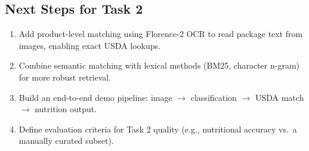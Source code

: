 \subsection{Next Steps for Task 2}

\begin{enumerate}[nosep,leftmargin=1.5em]
 \item Add product-level matching using Florence-2 OCR to read package text from images, enabling exact USDA lookups.
 \item Combine semantic matching with lexical methods (BM25, character n-gram) for more robust retrieval.
 \item Build an end-to-end demo pipeline: image $\rightarrow$ classification $\rightarrow$ USDA match $\rightarrow$ nutrition output.
 \item Define evaluation criteria for Task 2 quality (e.g., nutritional accuracy vs.\ a manually curated subset).
\end{enumerate}
